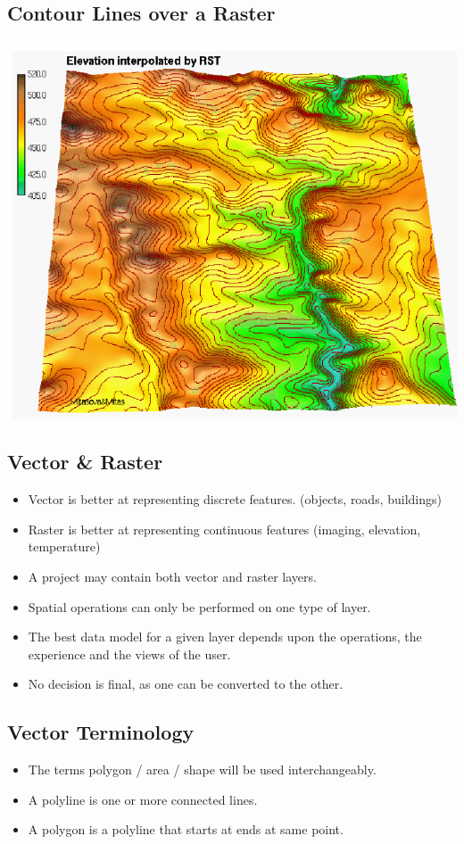 \documentclass[11pt]{article}
\theoremstyle{definition}
\begin{document}
\subsection{Contour Lines over a Raster}
\includegraphics[width=\textwidth/2]{19.png}

\subsection{Vector \& Raster}
\begin{itemize}
    \item Vector is better at representing discrete
    features. (objects, roads, buildings)
    \item Raster is better at representing continuous
    features (imaging, elevation, temperature)
    \item A project may contain both vector and
    raster layers.
    \item Spatial operations can only be performed
    on one type of layer.
    \item The best data model for a given layer
    depends upon the operations, the
    experience and the views of the user.
    \item No decision is final, as one can be
    converted to the other.
\end{itemize}

\subsection{Vector Terminology}
\begin{itemize}
    \item The terms
    polygon / area /
    shape will be
    used
    interchangeably.
    \item A polyline is one
    or more
    connected lines.
    \item A polygon is a
    polyline that
    starts at ends at
    same point.
\end{itemize}
\end{document}
